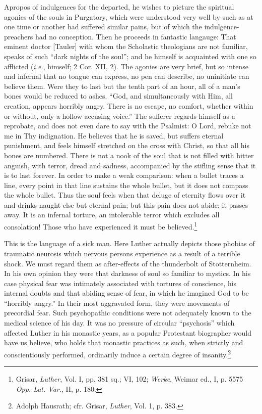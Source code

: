 Apropos of indulgences for the departed, he wishes to picture the spiritual
agonies of the souls in Purgatory, which were understood very well by such
as at one time or another had suffered similar pains, but of which the
indulgence-preachers had no conception. Then he proceeds in fantastic langauge:
That eminent doctor [Tauler] with whom the Scholastic theologians
are not familiar, speaks of such “dark nights of the soul”; and he himself is
acquainted with one so afflicted (\textit{i.e.}, himself; 2 Cor. XII, 2).
The agonies are very brief, but so intense and infernal that no tongue can
express, no pen can describe, no uninitiate can believe them.
Were they to last but the tenth part of an hour, all of a man’s bones would
be reduced to ashes. “God, and simultaneously with Him, all creation,
appears horribly angry. There is no escape, no comfort, whether within or
without, only a hollow accusing voice.” The sufferer regards himself as a
reprobate, and does not even dare to say with the Psalmist: O Lord, rebuke
not me in Thy indignation. He believes that he is saved, but suffers eternal
punishment, and feels himself stretched on the cross with Christ, so that
all his bones are numbered. There is not a nook of the soul that is not filled
with bitter anguish, with terror, dread and sadness, accompanied by the
stifling sense that it is to last forever. In order to make a weak comparison:
when a bullet traces a line, every point in that line sustains the whole bullet,
but it does not compass the whole bullet. Thus the soul feels when that
deluge of eternity flows over it and drinks naught else but eternal pain;
but this pain does not abide; it passes away. It is an infernal torture, an
intolerable terror which excludes all consolation! Those who have experienced it must be believed.\footnote
{Grisar, \textit{Luther}, Vol. I, pp. 381 sq.; VI, 102; \textit{Werke}, Weimar ed., I, p. 5575 \textit{Opp. Lat.
Var.}, II, p. 180. }

This is the language of a sick man. Here Luther actually depicts
those phobias of traumatic neurosis which nervous persons experience
as a result of a terrible shock. We must regard them as after-effects
of the thunderbolt of Stotternheim. In his own opinion they were
that darkness of soul so familiar to mystics. In his case physical
fear was intimately associated with tortures of conscience, his internal
doubts and that abiding sense of fear, in which he imagined
God to be “horribly angry.” In their most aggravated form, they
were movements of precordial fear. Such psychopathic conditions
were not adequately known to the medical science of his day. It was
no pressure of circular “psychosis” which affected Luther in his
monastic years, as a popular Protestant biographer would have us
believe, who holds that monastic practices as such, when strictly and
conscientiously performed, ordinarily induce a certain degree of insanity.\footnote
{Adolph Hausrath; cfr. Grisar, \textit{Luther}, Vol. 1, p. 383.}

